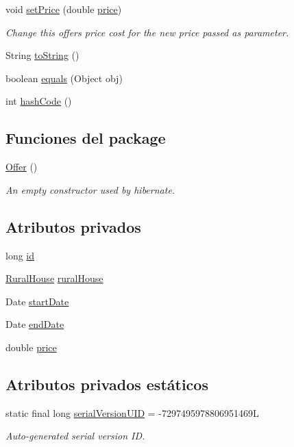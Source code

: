 \begin{DoxyCompactItemize}
void \mbox{\hyperlink{a00184_aaf77b7df1299a14ecc9cae2040dec6af}{set\+Price}} (double \mbox{\hyperlink{a00184_a2106c38f0c490e3263b1364c3ac56b0a}{price}})
\begin{DoxyCompactList}\small\item\em Change this offers price cost for the new price passed as parameter. \end{DoxyCompactList}\item 
String \mbox{\hyperlink{a00184_a91920170708c786730b8707d51d5a810}{to\+String}} ()
\item 
boolean \mbox{\hyperlink{a00184_aea11cafbf3e7304d38630b80a3f4dc1e}{equals}} (Object obj)
\item 
int \mbox{\hyperlink{a00184_aad4fd5441e084e41b30bb1d8d3597c48}{hash\+Code}} ()
\end{DoxyCompactItemize}
\subsection*{Funciones del \textquotesingle{}package\textquotesingle{}}
\begin{DoxyCompactItemize}
\item 
\mbox{\hyperlink{a00184_aa25c14124afd5f3f53c26ef4a564397d}{Offer}} ()
\begin{DoxyCompactList}\small\item\em An empty constructor used by hibernate. \end{DoxyCompactList}\end{DoxyCompactItemize}
\subsection*{Atributos privados}
\begin{DoxyCompactItemize}
\item 
long \mbox{\hyperlink{a00184_aba6516f5b9bb2dbe5d8b99404335adfc}{id}}
\item 
\mbox{\hyperlink{a00188}{Rural\+House}} \mbox{\hyperlink{a00184_a87036858904c59c964d2c75137a97323}{rural\+House}}
\item 
Date \mbox{\hyperlink{a00184_a3c4e8f6eb72413f6f76b1e4b05404ea8}{start\+Date}}
\item 
Date \mbox{\hyperlink{a00184_a315f9b97f02da79a97fa489db212b5ce}{end\+Date}}
\item 
double \mbox{\hyperlink{a00184_a2106c38f0c490e3263b1364c3ac56b0a}{price}}
\end{DoxyCompactItemize}
\subsection*{Atributos privados estáticos}
\begin{DoxyCompactItemize}
\item 
static final long \mbox{\hyperlink{a00184_a4516c2ff68502d92f1405b8478e9fe6f}{serial\+Version\+U\+ID}} = -\/7297495978806951469L
\begin{DoxyCompactList}\small\item\em Auto-\/generated serial version ID. \end{DoxyCompactList}\end{DoxyCompactItemize}



